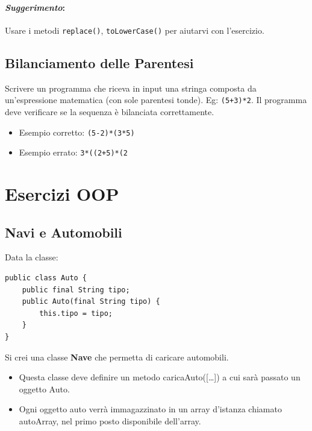\documentclass{article}
\begin{document}
\paragraph{\textit{Suggerimento}:} Usare i metodi \texttt{replace()}, \texttt{toLowerCase()} per aiutarvi con l'esercizio.

\subsection{Bilanciamento delle Parentesi}
Scrivere un programma che riceva in input una stringa composta da un'espressione matematica (con sole parentesi tonde). Eg: \texttt{(5+3)*2}. Il programma deve verificare se la sequenza è bilanciata correttamente.
\begin{itemize}
    \item Esempio corretto: \texttt{(5-2)*(3*5)}
    \item Esempio errato: \texttt{3*((2+5)*(2}
\end{itemize}

\section{Esercizi OOP}
\subsection{Navi e Automobili}
Data la classe:
\begin{verbatim}
public class Auto {
    public final String tipo;
    public Auto(final String tipo) {
        this.tipo = tipo;
    }
}
\end{verbatim}
Si crei una classe \textbf{Nave} che permetta di caricare automobili.
\begin{itemize}
    \item Questa classe deve deﬁnire un metodo caricaAuto([…]) a cui sarà passato un oggetto Auto.
    \item Ogni
oggetto auto verrà immagazzinato in un array d’istanza chiamato autoArray, nel primo posto
disponibile dell’array.
\end{itemize}
\end{document}
